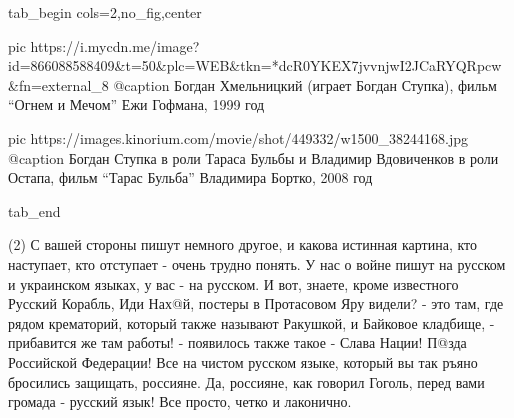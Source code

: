 \ifcmt
  tab_begin cols=2,no_fig,center

		 pic https://i.mycdn.me/image?id=866088588409&t=50&plc=WEB&tkn=*dcR0YKEX7jvvnjwI2JCaRYQRpcw&fn=external_8
		 @caption Богдан Хмельницкий (играет Богдан Ступка), фильм \enquote{Огнем и Мечом} Ежи Гофмана, 1999 год

		 pic https://images.kinorium.com/movie/shot/449332/w1500_38244168.jpg
		 @caption Богдан Ступка в роли Тараса Бульбы и Владимир Вдовиченков в роли Остапа, фильм \enquote{Тарас Бульба} Владимира Бортко, 2008 год

  tab_end
\fi

(2) С вашей стороны пишут немного другое, и какова истинная картина, кто
наступает, кто отступает - очень трудно понять.  У нас о войне пишут на русском
и украинском языках, у вас - на русском. И вот, знаете, кроме известного
Русский Корабль, Иди Нах@й, постеры в Протасовом Яру видели? - это там, где
рядом крематорий, который также называют Ракушкой, и Байковое кладбище, -
прибавится же там работы! - появилось также такое - Слава Нации!  П@зда
Российской Федерации! Все на чистом русском языке, который вы так ръяно
бросились защищать, россияне. Да, россияне, как говорил Гоголь, перед вами
громада - русский язык!  Все просто, четко и лаконично.

